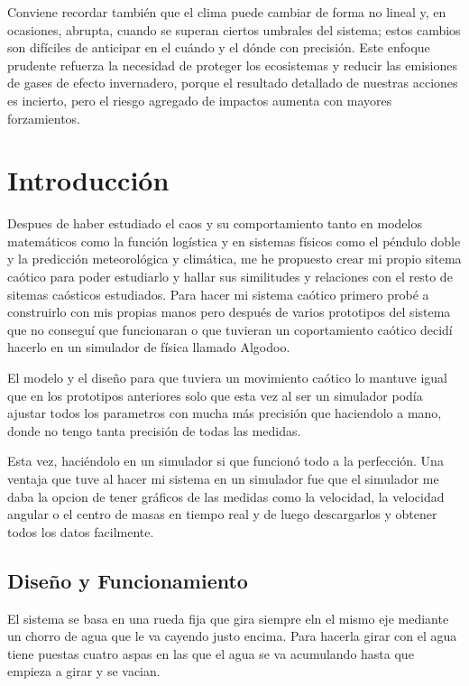 \documentclass[
  10pt,
  a4paper,
  DIV=11,
  numbers=noendperiod,
  open=any]{scrreprt}
\numberwithin{equation}{chapter}
\numberwithin{equation}{chapter}
\renewcommand{\[}{\begin{equation}}
\renewcommand{\]}{\end{equation}}
\begin{document}
Conviene recordar también que el clima puede cambiar de forma no lineal
y, en ocasiones, abrupta, cuando se superan ciertos umbrales del
sistema; estos cambios son difíciles de anticipar en el cuándo y el
dónde con precisión. Este enfoque prudente refuerza la necesidad de
proteger los ecosistemas y reducir las emisiones de gases de efecto
invernadero, porque el resultado detallado de nuestras acciones es
incierto, pero el riesgo agregado de impactos aumenta con mayores
forzamientos.


\chapter{Introducción}\label{introducciuxf3n-5}

Despues de haber estudiado el caos y su comportamiento tanto en modelos
matemáticos como la función logística y en sistemas físicos como el
péndulo doble y la predicción meteorológica y climática, me he propuesto
crear mi propio sitema caótico para poder estudiarlo y hallar sus
similitudes y relaciones con el resto de sitemas caósticos estudiados.
Para hacer mi sistema caótico primero probé a construirlo con mis
propias manos pero después de varios prototipos del sistema que no
conseguí que funcionaran o que tuvieran un coportamiento caótico decidí
hacerlo en un simulador de física llamado Algodoo.

El modelo y el diseño para que tuviera un movimiento caótico lo mantuve
igual que en los prototipos anteriores solo que esta vez al ser un
simulador podía ajustar todos los parametros con mucha más precisión que
haciendolo a mano, donde no tengo tanta precisión de todas las medidas.

Esta vez, haciéndolo en un simulador si que funcionó todo a la
perfección. Una ventaja que tuve al hacer mi sistema en un simulador fue
que el simulador me daba la opcion de tener gráficos de las medidas como
la velocidad, la velocidad angular o el centro de masas en tiempo real y
de luego descargarlos y obtener todos los datos facilmente.

\section{Diseño y Funcionamiento}\label{diseuxf1o-y-funcionamiento}

El sistema se basa en una rueda fija que gira siempre eln el mismo eje
mediante un chorro de agua que le va cayendo justo encima. Para hacerla
girar con el agua tiene puestas cuatro aspas en las que el agua se va
acumulando hasta que empieza a girar y se vacian.
\end{document}
